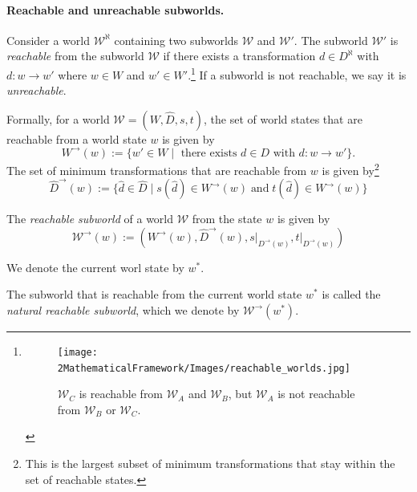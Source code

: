 \paragraph{Reachable and unreachable subworlds.}
Consider a world $\mathscr{W}^{\aleph}$ containing two subworlds $\mathscr{W}$ and $\mathscr{W}'$.
The subworld $\mathscr{W}'$ is \emph{reachable} from the subworld $\mathscr{W}$ if there exists a transformation $d \in D^{\aleph}$ with $d: w \to w'$ where $w \in W$ and $w' \in W'$.\footnote{
\begin{figure}[H]
	\centering
	\texttt{[image: 2MathematicalFramework/Images/reachable\_worlds.jpg]}
	\caption{
		$\mathscr{W}_{C}$ is reachable from $\mathscr{W}_{A}$ and $\mathscr{W}_{B}$, but $\mathscr{W}_{A}$ is not reachable from $\mathscr{W}_{B}$ or $\mathscr{W}_{C}$.
	}
	\label{fig:reachable_worlds}
\end{figure}
}
If a subworld is not reachable, we say it is \emph{unreachable}.

Formally, for a world $\mathscr{W} = (W, \hat{D}, s, t)$, the set of world states that are reachable from a world state $w$ is given by
\begin{equation}
	W^{\to}(w) := \{ w' \in W \mid \text{ there exists } d \in D \text{ with } d: w \to w' \}.
\end{equation}
The set of minimum transformations that are reachable from $w$ is given by\footnote{
	This is the largest subset of minimum transformations that stay within the set of reachable states.
}
\begin{equation}
	\hat{D}^{\to}(w) := \{ \hat{d} \in \hat{D} \mid s(\hat{d}) \in W^{\to}(w) \; \text{and} \; t(\hat{d}) \in W^{\to}(w) \}
\end{equation}

The \emph{reachable subworld} of a world $\mathscr{W}$ from the state $w$ is given by
\begin{equation}
	\mathscr{W}^{\to}(w) := (W^{\to}(w), \hat{D}^{\to}(w), s \big|_{D^{\to}(w)}, t \big|_{D^{\to}(w)})
\end{equation}

\begin{definition}
	We denote the current worl state by $w^{*}$.
\end{definition}

The subworld that is reachable from the current world state $w^{*}$ is called the \emph{natural reachable subworld}, which we denote by $\mathscr{W}^{\to}(w^{*})$.

